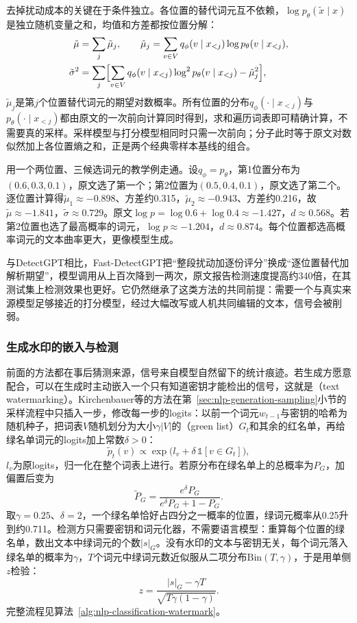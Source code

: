 去掉扰动成本的关键在于条件独立。各位置的替代词元互不依赖，$\log p_\theta(\widetilde x\mid x)$是独立随机变量之和，均值和方差都按位置分解：
\[
  \begin{aligned}
    \tilde\mu&=\sum_j\tilde\mu_j,\qquad
    \tilde\mu_j=\sum_{v\in V}q_\phi(v\mid x_{<j})\log p_\theta(v\mid x_{<j}),\\
    \tilde\sigma^2&=\sum_j\Bigl[\sum_{v\in V}q_\phi(v\mid x_{<j})\log^2p_\theta(v\mid x_{<j})-\tilde\mu_j^2\Bigr],
  \end{aligned}
\]
$\tilde\mu_j$是第$j$个位置替代词元的期望对数概率。所有位置的分布$q_\phi(\cdot\mid x_{<j})$与$p_\theta(\cdot\mid x_{<j})$都由原文的一次前向计算同时得到，求和遍历词表即可精确计算，不需要真的采样。采样模型与打分模型相同时只需一次前向；分子此时等于原文对数似然加上各位置熵之和，正是两个经典零样本基线的组合。

用一个两位置、三候选词元的教学例走通。设$q_\phi=p_\theta$，第1位置分布为$(0.6,0.3,0.1)$，原文选了第一个；第2位置为$(0.5,0.4,0.1)$，原文选了第二个。逐位置计算得$\tilde\mu_1\approx-0.898$、方差约0.315，$\tilde\mu_2\approx-0.943$、方差约0.216，故$\tilde\mu\approx-1.841$，$\tilde\sigma\approx0.729$。原文$\log p=\log0.6+\log0.4\approx-1.427$，$d\approx0.568$。若第2位置也选了最高概率的词元，$\log p\approx-1.204$，$d\approx0.874$。每个位置都选高概率词元的文本曲率更大，更像模型生成。

与DetectGPT相比，Fast-DetectGPT把“整段扰动加逐份评分”换成“逐位置替代加解析期望”，模型调用从上百次降到一两次，原文报告检测速度提高约340倍，在其测试集上检测效果也更好。它仍然继承了这类方法的共同前提：需要一个与真实来源模型足够接近的打分模型，经过大幅改写或人机共同编辑的文本，信号会被削弱。

\subsubsection{生成水印的嵌入与检测}
\label{sec:nlp-classification-watermark}

前面的方法都在事后猜测来源，信号来自模型自然留下的统计痕迹。若生成方愿意配合，可以在生成时主动嵌入一个只有知道密钥才能检出的信号，这就是（text watermarking）。Kirchenbauer等的方法在第~\ref{sec:nlp-generation-sampling}小节的采样流程中只插入一步，修改每一步的logits\cite{nlp-kirchenbauer2023watermark}：以前一个词元$w_{t-1}$与密钥的哈希为随机种子，把词表$V$随机划分为大小$\gamma|V|$的（green list）$G_t$和其余的红名单，再给绿名单词元的logits加上常数$\delta>0$：
\[
  \tilde p_t(v)\propto\exp\bigl(l_v+\delta\,\mathbb 1[v\in G_t]\bigr),
\]
$l_v$为原logits，归一化在整个词表上进行。若原分布在绿名单上的总概率为$P_G$，加偏置后变为
\[
  \tilde P_G=\frac{e^\delta P_G}{e^\delta P_G+1-P_G}.
\]取$\gamma=0.25$、$\delta=2$，一个绿名单恰好占四分之一概率的位置，绿词元概率从0.25升到约0.711。检测方只需要密钥和词元化器，不需要语言模型：重算每个位置的绿名单，数出文本中绿词元的个数$|s|_G$。没有水印的文本与密钥无关，每个词元落入绿名单的概率为$\gamma$，$T$个词元中绿词元数近似服从二项分布$\mathrm{Bin}(T,\gamma)$，于是用单侧$z$检验：
\begin{equation}
  \label{eq:nlp-classification-watermark-z}
  z=\frac{|s|_G-\gamma T}{\sqrt{T\gamma(1-\gamma)}}.
\end{equation}
完整流程见算法~\ref{alg:nlp-classification-watermark}。

